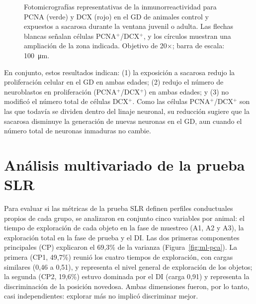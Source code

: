 \begin{figure}[htbp]
  \centering
  \caption[Fotomicrografías representativas del GD (PCNA y DCX)]{Fotomicrografías representativas de la inmunorreactividad para PCNA (verde) y DCX (rojo) en el GD de animales control y expuestos a sacarosa durante la ventana juvenil o adulta. Las flechas blancas señalan células PCNA$^{+}$/DCX$^{+}$, y los círculos muestran una ampliación de la zona indicada. Objetivo de 20$\times$; barra de escala: \SI{100}{\micro\metre}.}
  \label{fig:ihc-fotos}
\end{figure}

En conjunto, estos resultados indican: (1) la exposición a sacarosa redujo la proliferación celular en el GD en ambas edades; (2) redujo el número de neuroblastos en proliferación (PCNA$^{+}$/DCX$^{+}$) en ambas edades; y (3) no modificó el número total de células DCX$^{+}$. Como las células PCNA$^{+}$/DCX$^{+}$ son las que todavía se dividen dentro del linaje neuronal, su reducción sugiere que la sacarosa disminuye la generación de nuevas neuronas en el GD, aun cuando el número total de neuronas inmaduras no cambie.

\FloatBarrier
\section{Análisis multivariado de la prueba SLR}\label{sec:res-ml}

Para evaluar si las métricas de la prueba SLR definen perfiles conductuales propios de cada grupo, se analizaron en conjunto cinco variables por animal: el tiempo de exploración de cada objeto en la fase de muestreo (A1, A2 y A3), la exploración total en la fase de prueba y el DI. Las dos primeras componentes principales (CP) explicaron el 69,3\% de la varianza (Figura~\ref{fig:ml-pca}). La primera (CP1, 49,7\%) reunió los cuatro tiempos de exploración, con cargas similares (0,46 a 0,51), y representa el nivel general de exploración de los objetos; la segunda (CP2, 19,6\%) estuvo dominada por el DI (carga 0,91) y representa la discriminación de la posición novedosa. Ambas dimensiones fueron, por lo tanto, casi independientes: explorar más no implicó discriminar mejor.

